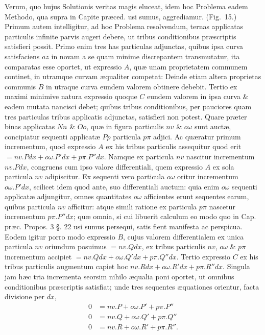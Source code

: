 Verum, quo hujus Solutionis veritas magis eluceat, idem hoc Problema eadem Methodo, qua supra in Capite præced. usi sumus, aggrediamur. (Fig.~15.) Primum autem intelligitur, ad hoc Problema resolvendum, ternas applicatas particulis infinite parvis augeri debere, ut tribus conditionibus præscriptis satisfieri possit. Primo enim tres has particulas adjunctas, quibus ipsa curva satisfaciens $az$ in novam a se quam minime discrepantem transmutatur, ita comparatas esse oportet, ut expressio $A$, quæ unam proprietatem communem continet, in utramque curvam æqualiter competat: Deinde etiam altera proprietas communis $B$ in utraque curva eundem valorem obtinere debebit. Tertio ex maximi minimive natura expressio quoque $C$ eundem valorem in ipsa curva \& eadem mutata nancisci debet; quibus tribus conditionibus, per pauciores quam tres particulas tribus applicatis adjunctas, satisfieri non potest. Quare præter binas applicatas $Nn$ \& $Oo$, quæ in figura particulis $nv$ \& $o\omega$ sunt auctæ, concipiatur sequenti applicatæ $Pp$ particula $p\pi$ adjici. Ac quæratur primum incrementum, quod expressio $A$ ex his tribus particulis assequitur quod erit $=nv.Pdx+o\omega.P'dx+p\pi.P''dx$. Namque ex particula $nv$ nascitur incrementum $nv.Pdx$, congruens cum ipso valore differentiali, quem expressio $A$ ex sola particula $nv$ adipiscitur. Ex sequenti vero particula $o\omega$ oritur incrementum $o\omega.P'dx$, scilicet idem quod ante, suo differentiali auctum: quia enim $o\omega$ sequenti applicatæ adjungitur, omnes quantitates $o\omega$ afficientes erunt sequentes earum, quibus particula $nv$ afficitur: atque simili ratione ex particula $p\pi$ nascetur incrementum $p\pi.P''dx$; quæ omnia, si cui libuerit calculum eo modo quo in Cap. præc. Propos. 3 §. 22 usi sumus persequi, satis fient manifesta ac perspicua. Eodem igitur porro modo expressio $B$, cujus valorem differentialem ex unica particula $nv$ oriundum posuimus $=nv.Qdx$, ex tribus particulis $nv$, $o\omega$ \& $p\pi$ incrementum accipiet $=nv.Qdx+o\omega.Q'dx+p\pi.Q''dx$. Tertio expressio $C$ ex his tribus particulis augmentum capiet hoc $nv.Rdx+o\omega.R'dx+p\pi.R''dx$. Singula jam hæc tria incrementa seorsim nihilo æqualia poni oportet, ut omnibus conditionibus præscriptis satisfiat; unde tres sequentes æquationes orientur, facta divisione per $dx$,
\[\begin{aligned}
0&=nv.P+o\omega.P'+p\pi.P''\\
0&=nv.Q+o\omega.Q'+p\pi.Q''\\
0&=nv.R+o\omega.R'+p\pi.R''.
\end{aligned}\]
